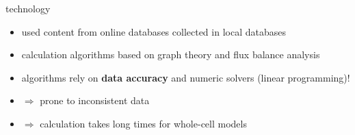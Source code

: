 \documentclass[style=ufz]{powerdot}
\begin{document}
\begin{slide}{technology}
\begin{itemize}
 \item used content from online databases collected in local databases\newline\pause
 \item calculation algorithms based on graph theory and flux balance analysis\newline\pause
 \item algorithms rely on \textbf{data accuracy} and numeric solvers (linear programming)!\newline\pause
 \item $\Rightarrow$ prone to inconsistent data\newline\pause
 \item $\Rightarrow$ calculation takes long times for whole-cell models
\end{itemize}
\end{slide}
\end{document}
